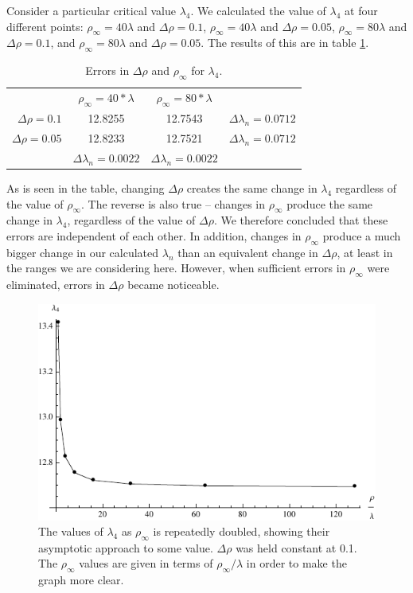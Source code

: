 \documentclass[12pt,twoside]{reedthesis}
\begin{document}
Consider a particular critical value $\lambda_{4}$. We calculated the value of $\lambda_{4}$ at four different points: $\rho_{\infty} = 40\lambda$ and $\Delta \rho = 0.1$, $\rho_{\infty} = 40\lambda$ and $\Delta \rho = 0.05$, $\rho_{\infty} = 80\lambda$ and $\Delta \rho = 0.1$, and $\rho_{\infty} = 80\lambda$ and $\Delta \rho = 0.05$. The results of this are in table \ref{tab:errorchanges}. 
\begin{table}
\centering
\begin{tabular}{r|c|c|c|}
\multicolumn{1}{r}{}
 &  \multicolumn{1}{c}{$\rho_{\infty} = 40*\lambda$}
 & \multicolumn{1}{c}{$\rho_{\infty} = 80*\lambda$}
 & \multicolumn{1}{l}{} \\
\cline{2-4}
$\Delta \rho = 0.1$ & 12.8255 & 12.7543 & $\Delta \lambda_n = 0.0712$\\
\cline{2-4}
$\Delta \rho = 0.05$ & 12.8233 & 12.7521& $\Delta \lambda_n = 0.0712$ \\
\cline{2-4}
\multicolumn{1}{r}{}
 &  \multicolumn{1}{|c|}{$\Delta \lambda_n = 0.0022$}
 & \multicolumn{1}{c|}{$\Delta \lambda_n = 0.0022$}
 & \multicolumn{1}{l}{} \\
 \cline{2-3}
\end{tabular}
\caption{Errors in $\Delta \rho$ and $\rho_{\infty}$ for $\lambda_4$.}
\label{tab:errorchanges}
\end{table}
As is seen in the table, changing $\Delta \rho$ creates the same change in $\lambda_4$ regardless of the value of $\rho_{\infty}$. The reverse is also true -- changes in $\rho_{\infty}$ produce the same change in $\lambda_4$, regardless of the value of $\Delta \rho$. We therefore concluded that these errors are independent of each other. In addition, changes in $\rho_{\infty}$ produce a much bigger change in our calculated $\lambda_{n}$ than an equivalent change in $\Delta \rho$, at least in the ranges we are considering here. However, when sufficient errors in $\rho_{\infty}$ were eliminated, errors in $\Delta \rho$ became noticeable.
 \begin{figure}[h]
\centering
\includegraphics{Figures/asymtote}
\caption[Asymtotic behavior of $\lambda_{4} (\rho_{\infty})$]{The values of $\lambda_{4}$ as $\rho_{\infty}$ is repeatedly doubled, showing their asymptotic approach to some value. $\Delta \rho$ was held constant at 0.1. The $\rho_{\infty}$ values are given in terms of $\rho_{\infty}/\lambda$ in order to make the graph more clear.}
\label{fig:asymtote}
\end{figure} 
\end{document}
